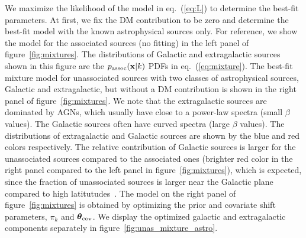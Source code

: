 \documentclass[12pt, a4paper]{article}
\newcommand{\aure}[1]{\textcolor{orange}{[AA: #1]}}
\newcommand{\bx}{{\bf x}}
\newcommand{\btheta}{\boldsymbol{\theta}}
\newcommand{\sigmav}{\langle \sigma v \rangle}
\begin{document}




We maximize the likelihood of the model in eq.~(\ref{eq:L}) to determine the best-fit parameters.
At first, we fix the DM contribution to be zero and determine the best-fit model with the known astrophysical sources only.
For reference, we show the model for the associated sources (no fitting) in the left panel of figure~\ref{fig:mixtures}.
The distributions of Galactic and extragalactic sources shown in this figure are the $p_{\rm assoc}(\bx|k)$ PDFs in eq.~(\ref{eq:mixture}).
The best-fit mixture model for unassociated sources with two classes of astrophysical sources, Galactic and extragalactic, but without a DM contribution is shown in the right panel of figure~\ref{fig:mixtures}. 
We note that the extragalactic sources are dominated by AGNs, which usually have close to a power-law spectra (small $\beta$ values).
The Galactic sources often have curved spectra (large $\beta$ values).
The distributions of extragalactic and Galactic sources are shown by the blue and red colors respectively.
The relative contribution of Galactic sources is larger for the unassociated sources compared to the associated ones (brighter red color in the right panel compared to the left panel in figure~\ref{fig:mixtures}), which is expected, since the fraction of unassociated sources is larger near the Galactic plane compared to high latitutudes~\cite{2022ApJS..260...53A}.
The model on the right panel of figure~\ref{fig:mixtures} is obtained by optimizing the prior and covariate shift parameters, $\pi_k$ and $\btheta_{\rm cov}$.
We display the optimized galactic and extragalactic components separately in figure~\ref{fig:unas_mixture_astro}.
\end{document}

